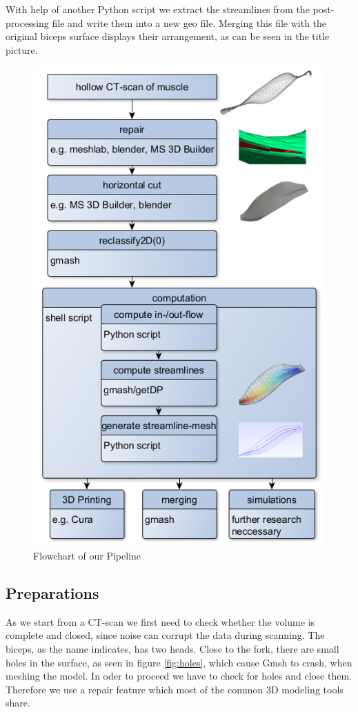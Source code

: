 \documentclass[preprint,journal]{vgtc}       %
\begin{document}
With help of another Python script we extract the streamlines from the post-processing file and write them into a new geo file. 
Merging this file with the original biceps surface displays their arrangement, as can be seen in the title picture.
\begin{figure} 
	\begin{center}
		\includegraphics[width=0.81\linewidth]{flow006.png}
	\end{center}
	\caption{Flowchart of our Pipeline}
	\label{fig:flow}
	
\end{figure}
\subsection{Preparations}
As we start from a CT-scan we first need to check whether the volume is complete and closed, since noise can corrupt the data during scanning.
The biceps, as the name indicates, has two heads. 
Close to the fork, there are small holes in the surface, as seen  in figure \ref{fig:holes}, which cause Gmsh to crash, when meshing the model. 
In oder to proceed we have to check for holes and close them.
Therefore we use a repair feature which most of the common 3D modeling tools share. 
\end{document}
